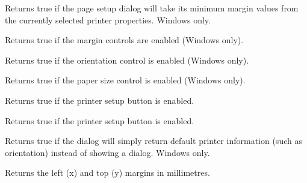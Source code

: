 Returns true if the page setup dialog will take its minimum margin values from the currently
selected printer properties. Windows only.

\label{wxpagesetupdialogdatagetenablemargins}


Returns true if the margin controls are enabled (Windows only).

\label{wxpagesetupdialogdatagetenableorientation}


Returns true if the orientation control is enabled (Windows only).

\label{wxpagesetupdialogdatagetenablepaper}


Returns true if the paper size control is enabled (Windows only).

\label{wxpagesetupdialogdatagetenableprinter}


Returns true if the printer setup button is enabled.

\label{wxpagesetupdialogdatagetenablehelp}


Returns true if the printer setup button is enabled.

\label{wxpagesetupdialogdatagetdefaultinfo}


Returns true if the dialog will simply return default printer information (such as orientation)
instead of showing a dialog. Windows only.

\label{wxpagesetupdialogdatagetmargintopleft}


Returns the left (x) and top (y) margins in millimetres.

\label{wxpagesetupdialogdatagetmarginbottomright}

